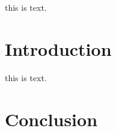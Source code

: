 \documentclass{article}
\begin{document}
this is text.
\section{Introduction}
\label{sec:thefirst}
this is text.
\label{sec:thesecond}
\section{Conclusion}
\end{document}
